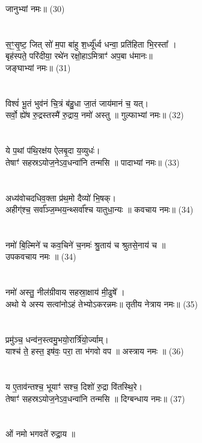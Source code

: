 जानुभ्यां नमः॥ (30)\\
{\small{}}\\
\\
स॒ꣳ॒सृ॒ष्ट॒ जित् सो॑ म॒पा बा॑हु श॒र्ध्यू᳚र्ध्व धन्वा॒ प्रति॑हिता भि॒रस्ता᳚ ।\\
बृह॑स्पते॒ परि॑दीया॒ रथे॑न रक्षो॒हाऽमित्राꣳ॑ अप॒बा ध॑मानः॥ \\
जङ्घाभ्यां नमः॥ (31)\\
{\small{}}\\
\\
विश्वं॑ भू॒तं भुव॑नं चि॒त्रं ब॑हु॒धा जा॒तं जाय॑मानं च॒ यत्।\\
सर्वो॒ ह्ये॑ष रु॒द्रस्तस्मै॑ रु॒द्राय॒ नमो॑ अस्तु ॥ गुल्फाभ्यां नमः॥ (32)\\
{\small{}}\\
\\
ये प॒थां प॑थि॒रक्ष॑य ऐलबृ॒दा य॒व्युधः॑।\\
तेषाꣳ॑ सहस्रऽयोज॒नेऽव॒धन्वा॑नि तन्मसि ॥ पादाभ्यां नमः॥ (33)\\
{\small{}}\\
\\
अध्य॑वोचदधिव॒क्ता प्र॑थ॒मो दैव्यो॑ भि॒षक्।\\
अहीग्॑श्च॒ सर्वा᳚ञ्ज॒म्भय॒न्थ्सर्वा᳚श्च यातुधा॒न्यः ॥ कवचाय नमः॥ (34)\\
{\small{}}\\
\\
नमो॑ बि॒ल्मिने॑ च कव॒चिने॑ च॒नमः॑ श्रु॒ताय॑ च श्रुतसे॒नाय॑ च ॥ \\
उपकवचाय नमः ॥ (34)\\
{\small{}}\\
\\
नमो॑ अस्तु॒ नील॑ग्रीवाय सहस्रा॒क्षाय॑ मी॒ढुषे᳚ ।\\
अथो ये अस्य सत्वांनोऽहं तेभ्योऽकरन्नमः॥ तृतीय नेत्राय नमः॥ (35)\\
{\small{}}\\
\\
प्रमु॑ञ्च॒ धन्व॑न॒स्त्वमु॒भयो॒रार्त्रि॑यो॒र्ज्याम्। \\
याश्च॑ ते॒ हस्त॒ इष॑वः॒ परा॒ ता भ॑गवो वप ॥ अस्त्राय नमः ॥ (36)\\
{\small{}}\\
\\
य ए॒ताव॑न्तश्च॒ भूयाꣳ॑ सश्च॒ दिशो॑ रु॒द्रा वि॑तस्थि॒रे।\\
तेषाꣳ॑ सहस्रऽयोज॒नेऽव॒धन्वा॑नि तन्मसि ॥ दिग्बन्धाय नमः॥ (37)\\
{\small{}}\\
\\
ओं नमो भगवते॑ रुद्रा॒य ॥\\
